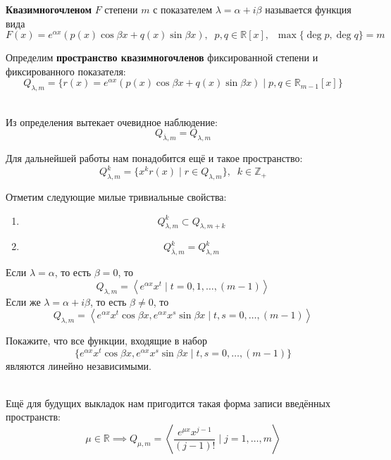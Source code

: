 \documentclass[11pt]{article}
\begin{document}
\begin{definition}
    \textbf{Квазимногочленом} $F$ степени $m$ с показателем $\lambda = \alpha + i \beta$ называется функция вида
    \[F(x) = e^{\alpha x} (p(x) \cos \beta x + q(x) \sin \beta x), \; \; p, q \in \mathbb{R}[x], \; \; \max \{\deg p, \deg q\} = m\]
\end{definition}

\begin{definition}
    Определим \textbf{пространство квазимногочленов} фиксированной степени и фиксированного показателя:
    \[Q_{\lambda, m} = \{r(x) = e^{\alpha x} (p(x) \cos \beta x + q(x) \sin \beta x) \; | \; p, q \in \mathbb{R}_{m - 1}[x]\} \]
\end{definition} \leavevmode
\\
Из определения вытекает очевидное наблюдение:
\[Q_{\overline{\lambda}, m} = Q_{\lambda, m}\]

\begin{definition}
    Для дальнейшей работы нам понадобится ещё и такое пространство:
    \[Q_{\lambda, m}^k = \{x^k r(x) \; | \; r \in Q_{\lambda, m}\}, \; \; k \in \mathbb{Z}_{+}\]
\end{definition}

\begin{remark}
    Отметим следующие милые тривиальные свойства:
    \begin{enumerate}
        \item \[Q_{\lambda, m}^k \subset Q_{\lambda, m + k}\]
        \item \[Q_{\overline{\lambda}, m}^k = Q_{\lambda, m}^k\]
    \end{enumerate}
\end{remark}

\begin{remark}
    Если $\lambda = \alpha$, то есть $\beta = 0$, то
    \[Q_{\lambda, m} = \left\langle e^{\alpha x} x^t \; | \; t = 0, 1, \ldots, (m - 1)\right\rangle \]
    Если же $\lambda = \alpha + i \beta$, то есть $\beta \neq 0$, то 
    \[Q_{\lambda, m} = \left\langle e^{\alpha x} x^t \cos \beta x, e^{\alpha x} x^s \sin \beta x \; | \; t, s = 0, \ldots, (m - 1)\right\rangle \]
\end{remark}

\begin{exercise}
    Покажите, что все функции, входящие в набор
    \[\{e^{\alpha x} x^t \cos \beta x, e^{\alpha x} x^s \sin \beta x \; | \; t, s = 0, \ldots, (m - 1)\}\]
    являются линейно независимыми.
\end{exercise} \leavevmode
\\
Ещё для будущих выкладок нам пригодится такая форма записи введённых пространств:
\[\mu \in \mathbb{R} \implies Q_{\mu, m} = \left\langle \frac{e^{\mu x} x^{j - 1}}{(j - 1)!} \; | \; j = 1, \ldots, m\right\rangle \]
\end{document}
